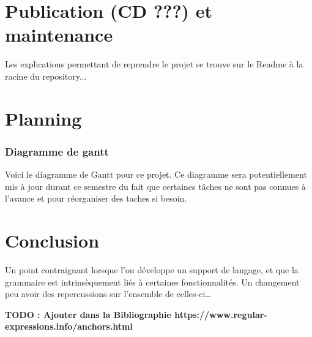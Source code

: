 \documentclass[
    iict, %
    il, %
]{heig-tb}
\begin{document}
\chapter{Publication (CD ???) et maintenance}


Les explications permettant de  reprendre le projet se trouve sur le Readme à la racine du repository...

\chapter{Planning}


\subsection{Diagramme de gantt}
Voici le diagramme de Gantt pour ce projet.
Ce diagramme sera potentiellement mis à jour durant ce semestre du fait que certaines tâches ne sont pas connues à l'avance et pour réorganiser des taches si besoin.



\chapter{Conclusion}

Un point contraignant lorsque l'on développe un support de langage, et que la grammaire est intrinsèquement liés à certaines fonctionnalités.
Un changement peu avoir des repercussions sur l'ensemble de celles-ci\dots




\label{glossaire}
\printnoidxglossary
{}

\textbf{TODO : Ajouter dans la Bibliographie https://www.regular-expressions.info/anchors.html}
\printbibliography
{}

\end{document}
